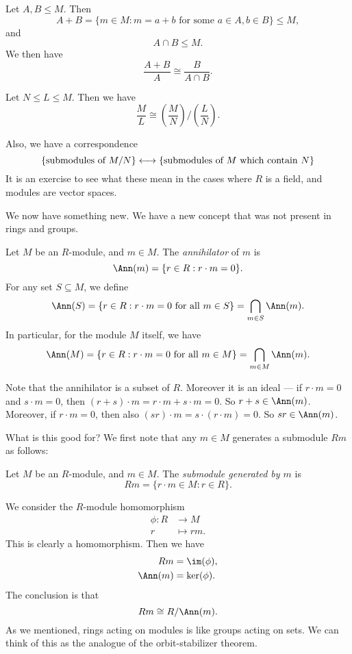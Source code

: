 \documentclass[a4paper]{article}
\begin{document}
\begin{thm}
  Let $A, B \leq M$. Then
  \[
    A + B = \{m \in M: m = a + b\text{ for some } a \in A, b \in B\} \leq M,
  \]
  and
  \[
    A \cap B \leq M.
  \]
  We then have
  \[
    \frac{A + B}{A} \cong \frac{B}{A \cap B}.
  \]
\end{thm}

\begin{thm}
  Let $N \leq L \leq M$. Then we have
  \[
    \frac{M}{L} \cong \left(\frac{M}{N}\right)\big/ \left(\frac{L}{N}\right).
  \]
\end{thm}

Also, we have a correspondence
\[
  \{\text{submodules of }M/N\} \longleftrightarrow\{\text{submodules of }M\text{ which contain }N\}\\
\]
It is an exercise to see what these mean in the cases where $R$ is a field, and modules are vector spaces.

We now have something new. We have a new concept that was not present in rings and groups.
\begin{defi}[Annihilator]
  Let $M$ be an $R$-module, and $m \in M$. The \emph{annihilator} of $m$ is
  \[
    \Ann(m) = \{r \in R: r \cdot m = 0\}.
  \]
  For any set $S \subseteq M$, we define
  \[
    \Ann(S) = \{r \in R: r \cdot m = 0\text{ for all }m \in S\} = \bigcap_{m \in S} \Ann(m).
  \]
  In particular, for the module $M$ itself, we have
  \[
    \Ann(M) = \{r \in R: r \cdot m = 0\text{ for all }m \in M\} = \bigcap_{m \in M} \Ann(m).
  \]
\end{defi}

Note that the annihilator is a subset of $R$. Moreover it is an ideal --- if $r \cdot m = 0$ and $s \cdot m = 0$, then $(r + s) \cdot m = r \cdot m + s \cdot m = 0$. So $r + s \in \Ann(m)$. Moreover, if $r \cdot m = 0$, then also $(sr) \cdot m = s \cdot (r \cdot m) = 0$. So $sr \in \Ann(m)$.

What is this good for? We first note that any $m \in M$ generates a submodule $Rm$ as follows:
\begin{defi}
  Let $M$ be an $R$-module, and $m \in M$. The \emph{submodule generated by $m$} is
  \[
    Rm = \{r \cdot m \in M: r \in R\}.
  \]
\end{defi}

We consider the $R$-module homomorphism
\begin{align*}
  \phi: R &\to M\\
  r &\mapsto rm.
\end{align*}
This is clearly a homomorphism. Then we have
\begin{align*}
  Rm &= \im(\phi),\\
  \Ann(m) &= \ker(\phi).
\end{align*}
The conclusion is that
\[
  Rm \cong R/\Ann(m).
\]
As we mentioned, rings acting on modules is like groups acting on sets. We can think of this as the analogue of the orbit-stabilizer theorem.
\end{document}
